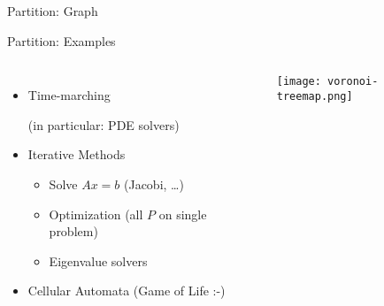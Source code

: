 \documentclass[english,compress]{beamer}
\begin{document}
\begin{frame}{Partition: Graph}
  \begin{center}
  \end{center}
\end{frame}

\begin{frame}{Partition: Examples}
  \begin{columns}
      \begin{itemize}
        \item Time-marching

          (in particular: PDE solvers)
        \item Iterative Methods
          \begin{itemize}
            \item Solve $Ax=b$ (Jacobi, \dots)
            \item Optimization (all $P$ on single problem)
            \item Eigenvalue solvers
          \end{itemize}
        \item Cellular Automata (Game of Life :-)
      \end{itemize}
      \texttt{[image: voronoi-treemap.png]}
  \end{columns}
\end{frame}
\end{document}
